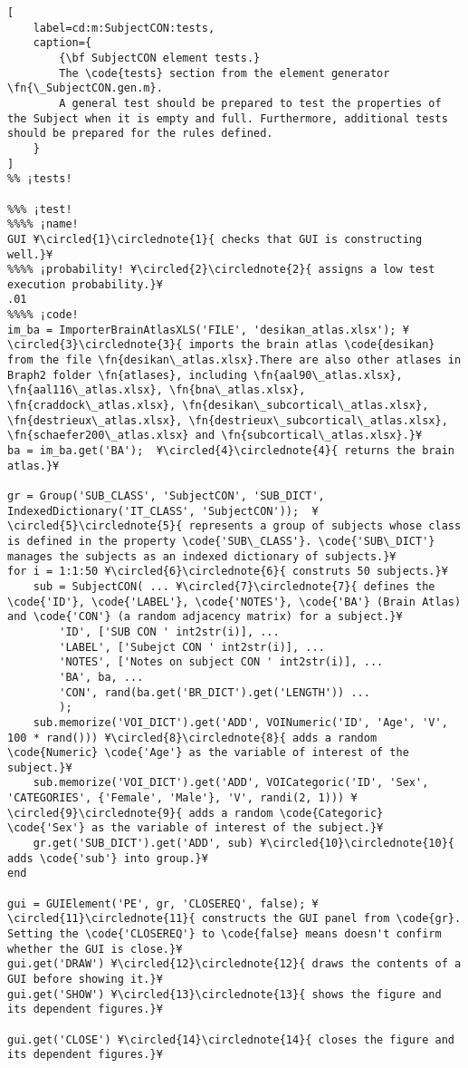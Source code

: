 \documentclass{tufte-handout}
\begin{document}
\clearpage

\begin{lstlisting}[
	label=cd:m:SubjectCON:tests,
	caption={
		{\bf SubjectCON element tests.}
		The \code{tests} section from the element generator \fn{\_SubjectCON.gen.m}.
		A general test should be prepared to test the properties of the Subject when it is empty and full. Furthermore, additional tests should be prepared for the rules defined.
	}
]			
%% ¡tests!

%%% ¡test!
%%%% ¡name!
GUI ¥\circled{1}\circlednote{1}{ checks that GUI is constructing well.}¥
%%%% ¡probability! ¥\circled{2}\circlednote{2}{ assigns a low test execution probability.}¥
.01
%%%% ¡code!
im_ba = ImporterBrainAtlasXLS('FILE', 'desikan_atlas.xlsx'); ¥\circled{3}\circlednote{3}{ imports the brain atlas \code{desikan} from the file \fn{desikan\_atlas.xlsx}.There are also other atlases in Braph2 folder \fn{atlases}, including \fn{aal90\_atlas.xlsx}, \fn{aal116\_atlas.xlsx}, \fn{bna\_atlas.xlsx}, \fn{craddock\_atlas.xlsx}, \fn{desikan\_subcortical\_atlas.xlsx}, \fn{destrieux\_atlas.xlsx}, \fn{destrieux\_subcortical\_atlas.xlsx},  \fn{schaefer200\_atlas.xlsx} and \fn{subcortical\_atlas.xlsx}.}¥
ba = im_ba.get('BA');  ¥\circled{4}\circlednote{4}{ returns the brain atlas.}¥

gr = Group('SUB_CLASS', 'SubjectCON', 'SUB_DICT', IndexedDictionary('IT_CLASS', 'SubjectCON'));  ¥\circled{5}\circlednote{5}{ represents a group of subjects whose class is defined in the property \code{'SUB\_CLASS'}. \code{'SUB\_DICT'} manages the subjects as an indexed dictionary of subjects.}¥
for i = 1:1:50 ¥\circled{6}\circlednote{6}{ construts 50 subjects.}¥
    sub = SubjectCON( ... ¥\circled{7}\circlednote{7}{ defines the \code{'ID'}, \code{'LABEL'}, \code{'NOTES'}, \code{'BA'} (Brain Atlas) and \code{'CON'} (a random adjacency matrix) for a subject.}¥
        'ID', ['SUB CON ' int2str(i)], ...
        'LABEL', ['Subejct CON ' int2str(i)], ...
        'NOTES', ['Notes on subject CON ' int2str(i)], ...
        'BA', ba, ...
        'CON', rand(ba.get('BR_DICT').get('LENGTH')) ...
        );
    sub.memorize('VOI_DICT').get('ADD', VOINumeric('ID', 'Age', 'V', 100 * rand())) ¥\circled{8}\circlednote{8}{ adds a random \code{Numeric} \code{'Age'} as the variable of interest of the subject.}¥
    sub.memorize('VOI_DICT').get('ADD', VOICategoric('ID', 'Sex', 'CATEGORIES', {'Female', 'Male'}, 'V', randi(2, 1))) ¥\circled{9}\circlednote{9}{ adds a random \code{Categoric} \code{'Sex'} as the variable of interest of the subject.}¥
    gr.get('SUB_DICT').get('ADD', sub) ¥\circled{10}\circlednote{10}{ adds \code{'sub'} into group.}¥
end

gui = GUIElement('PE', gr, 'CLOSEREQ', false); ¥\circled{11}\circlednote{11}{ constructs the GUI panel from \code{gr}. Setting the \code{'CLOSEREQ'} to \code{false} means doesn't confirm whether the GUI is close.}¥
gui.get('DRAW') ¥\circled{12}\circlednote{12}{ draws the contents of a GUI before showing it.}¥
gui.get('SHOW') ¥\circled{13}\circlednote{13}{ shows the figure and its dependent figures.}¥

gui.get('CLOSE') ¥\circled{14}\circlednote{14}{ closes the figure and its dependent figures.}¥
\end{lstlisting}
\end{document}
